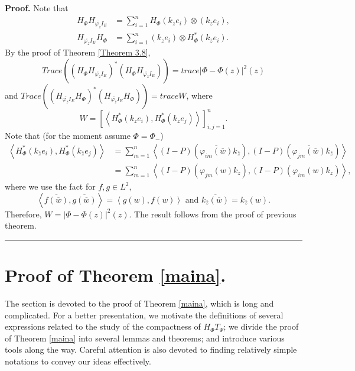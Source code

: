\documentclass{article}%
\newenvironment{proof}[1][Proof]{\noindent\textbf{#1.} }{\ \rule{0.5em}{0.5em}}
\begin{document}
\begin{proof}
Note that%
\begin{align*}
H_{\Phi}H_{\overline{\varphi_{\overline{z}}}I_{E}}  &  =\sum_{i=1}^{n}H_{\Phi
}\left(  k_{z}e_{i}\right)  \otimes\left(  k_{\overline{z}}e_{i}\right)  ,\\
H_{\overline{\varphi_{\overline{z}}}I_{E}}H_{\Phi}  &  =\sum_{i=1}^{n}\left(
k_{z}e_{i}\right)  \otimes H_{\Phi}^{\ast}\left(  k_{\overline{z}}%
e_{i}\right)  .
\end{align*}
By the proof of Theorem \ref{Theorem 3.8},%
\[
Trace(\left(  H_{\Phi}H_{\overline{\varphi_{\overline{z}}}I_{E}}\right)
^{\ast}\left(  H_{\Phi}H_{\overline{\varphi_{\overline{z}}}I_{E}}\right)
)=trace\left\vert \Phi-\Phi(z)\right\vert ^{2}(z)
\]
and $Trace(\left(  H_{\overline{\varphi_{\overline{z}}}I_{E}}H_{\Phi}\right)
^{\ast}\left(  H_{\overline{\varphi_{\overline{z}}}I_{E}}H_{\Phi}\right)
)=traceW$, where%
\[
W=\left[  \left\langle H_{\Phi}^{\ast}\left(  k_{\overline{z}}e_{i}\right)
,H_{\Phi}^{\ast}\left(  k_{\overline{z}}e_{j}\right)  \right\rangle \right]
_{i,j=1}^{n} .
\]
Note that (for the moment assume $\Phi=\Phi_{-}$)%
\begin{align*}
\left\langle H_{\Phi}^{\ast}\left(  k_{\overline{z}}e_{i}\right)  ,H_{\Phi
}^{\ast}\left(  k_{\overline{z}}e_{j}\right)  \right\rangle  &  =\sum
_{m=1}^{n}\left\langle (I-P)\left(  \overline{\varphi_{im}(\overline{w}%
)}k_{\overline{z}}\right)  ,(I-P)\left(  \overline{\varphi_{jm}(\overline{w}%
)}k_{\overline{z}}\right)  \right\rangle \\
&  =\sum_{m=1}^{n}\left\langle (I-P)\left(  \varphi_{jm}(w)k_{z}\right)
,(I-P)\left(  \varphi_{im}(w)k_{z}\right)  \right\rangle ,
\end{align*}
where we use the fact for $f,g\in L^{2},$%
\[
\left\langle \overline{f(\overline{w})},\overline{g(\overline{w}%
)}\right\rangle =\left\langle g(w),f(w)\right\rangle \text{ and }%
\overline{k_{\overline{z}}(\overline{w})}=k_{\overline{z}}(w).
\]
Therefore, $W=\left\vert \Phi-\Phi(z)\right\vert ^{2}(z).$ The result follows
from the proof of previous theorem.
\end{proof}

\section{Proof of Theorem \ref{maina}.}

\label{Section 4}

The section is devoted to the proof of Theorem \ref{maina}, which is long and
complicated. For a better presentation, we motivate the definitions of several
expressions related to the study of the compactness of $H_{\Phi}T_{\Psi}$; we
divide the proof of Theorem \ref{maina} into several lemmas and theorems; and
introduce various tools along the way. Careful attention is also devoted to
finding relatively simple notations to convey our ideas effectively.
\end{document}
